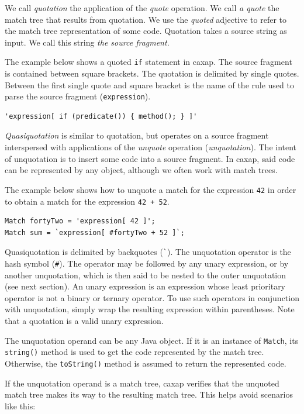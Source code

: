 We call \emph{quotation} the application of the \emph{quote} operation. We call
\emph{a quote} the match tree that results from quotation. We use the
\emph{quoted} adjective to refer to the match tree representation of some
code. Quotation takes a source string as input. We call this string \emph{the
  source fragment}.

The example below shows a quoted \texttt{if} statement in caxap. The source
fragment is contained between square brackets. The quotation is delimited by
single quotes. Between the first single quote and square bracket is the name of
the rule used to parse the source fragment (\texttt{expression}).

\begin{lstlisting}
'expression[ if (predicate()) { method(); } ]'
\end{lstlisting}

\emph{Quasiquotation} is similar to quotation, but operates on a source fragment
interspersed with applications of the \emph{unquote} operation
(\emph{unquotation}). The intent of unquotation is to insert some code into a
source fragment. In caxap, said code can be represented by any object, although
we often work with match trees.

The example below shows how to unquote a match for the expression \texttt{42} in
order to obtain a match for the expression \texttt{42 + 52}.

\begin{lstlisting}
Match fortyTwo = 'expression[ 42 ]';
Match sum = `expression[ #fortyTwo + 52 ]`;
\end{lstlisting}

Quasiquotation is delimited by backquotes (\lstinline{`}). The unquotation
operator is the hash symbol (\lstinline{#}). The operator may be followed by any
unary expression, or by another unquotation, which is then said to be nested to
the outer unquotation (see next section). An unary expression is an expression
whose least prioritary operator is not a binary or ternary operator. To use such
operators in conjunction with unquotation, simply wrap the resulting expression
within parentheses. Note that a quotation is a valid unary expression.

The unquotation operand can be any Java object. If it is an instance of
\texttt{Match}, its \texttt{string()} method is used to get the code represented
by the match tree. Otherwise, the \texttt{toString()} method is assumed to
return the represented code.

If the unquotation operand is a match tree, caxap verifies that the unquoted
match tree makes its way to the resulting match tree. This helps avoid scenarios
like this:

